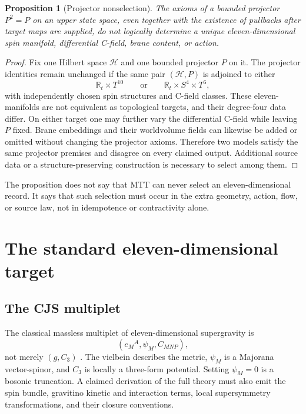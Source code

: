 \documentclass[11pt]{article}
\newtheorem{proposition}[theorem]{Proposition}
\theoremstyle{definition}
\theoremstyle{remark}
\newcommand{\cH}{\mathcal H}
\begin{document}
\begin{proposition}[Projector nonselection]
\label{prop:nonselection}
The axioms of a bounded projector \(P^2=P\) on an upper state space, even
together with the existence of pullbacks after target maps are supplied, do
not logically determine a unique eleven-dimensional spin manifold,
differential C-field, brane content, or action.
\end{proposition}

\begin{proof}
Fix one Hilbert space \(\cH\) and one bounded projector \(P\) on it.  The
projector identities remain unchanged if the same pair \((\cH,P)\) is
adjoined to either
\[
\mathbb R_t\times T^{10}
\qquad\text{or}\qquad
\mathbb R_t\times S^4\times T^6,
\]
with independently chosen spin structures and C-field classes.  These
eleven-manifolds are not equivalent as topological targets, and their
degree-four data differ.  On either target one may further vary the
differential C-field while leaving \(P\) fixed.  Brane embeddings and their
worldvolume fields can likewise be added or omitted without changing the
projector axioms.  Therefore two models satisfy the same projector premises
and disagree on every claimed output.  Additional source data or a
structure-preserving construction is necessary to select among them.
\end{proof}

The proposition does not say that MTT can never select an
eleven-dimensional record.  It says that such selection must occur in the
extra geometry, action, flow, or source law, not in idempotence or
contractivity alone.

\section{The standard eleven-dimensional target}
\label{sec:cjs}

\subsection{The CJS multiplet}

The classical massless multiplet of eleven-dimensional supergravity is
\[
(e_M{}^A,\psi_M,C_{MNP}),
\]
not merely \((g,C_3)\) \cite{CJS1978}.  The vielbein describes the metric,
\(\psi_M\) is a Majorana vector-spinor, and \(C_3\) is locally a three-form
potential.  Setting \(\psi_M=0\) is a bosonic truncation.  A claimed
derivation of the full theory must also emit the spin bundle, gravitino
kinetic and interaction terms, local supersymmetry transformations, and
their closure conventions.
\end{document}
